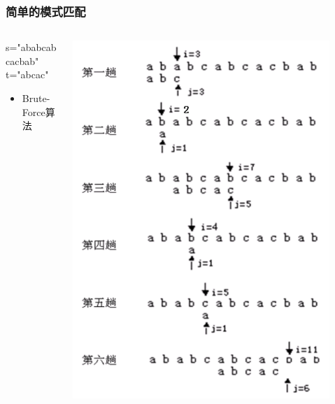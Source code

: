 \begin{frame}[fragile]
  \frametitle{简单的模式匹配}
  \begin{columns}
    \begin{column}[T]{0.5\linewidth}
      s="ababcabcacbab" \\ t="abcac"

      \begin{itemize}
      \item Brute-Force算法
      \end{itemize}
    \end{column}
    \begin{column}[T]{0.5\linewidth}
      \includegraphics[width=0.9\textwidth]{figs/string/pattern-match.png}
    \end{column}
  \end{columns}
\end{frame}

